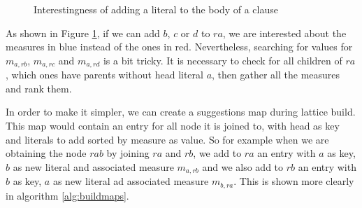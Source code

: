 \begin{figure}[!h]
  \caption{Interestingness of adding a literal to the body of a clause}
  \centering
  \label{fig:latticeSuggestion}
\end{figure}

As shown in Figure \ref{fig:latticeSuggestion}, if we can add $b$, $c$ or $d$ to $ra$, we are interested about the
measures in blue instead of the ones in red. Nevertheless, searching for values for $m_{a,rb}$, $m_{a,rc}$ and
$m_{a,rd}$ is a bit tricky. It is necessary to check for all children of $ra$, which ones have parents without head
literal $a$, then gather all the measures and rank them.

In order to make it simpler, we can create a suggestions map during lattice build. This map would contain an entry for
all node it is joined to, with head as key and literals to add sorted by measure as value. So for example when we are
obtaining the node $rab$ by joining $ra$ and $rb$, we add to $ra$ an entry with $a$ as key, $b$ as new literal and
associated measure $m_{a,rb}$ and we also add to $rb$ an entry with $b$ as key, $a$ as new literal ad associated measure
$m_{b,ra}$. This is shown more clearly in algorithm \ref{alg:buildmaps}.

